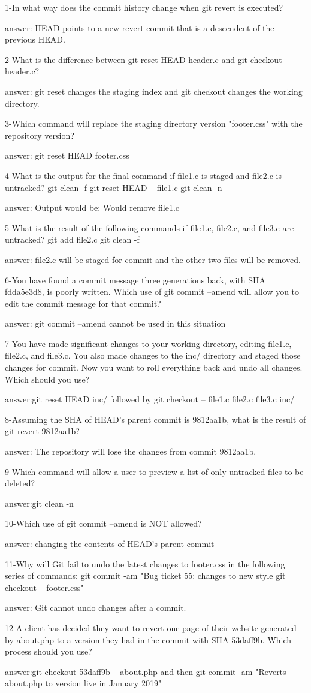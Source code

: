 1-In what way does the commit history change when git revert is executed?

answer: HEAD points to a new revert commit that is a descendent of the previous HEAD.

2-What is the difference between git reset HEAD header.c and git checkout -- header.c?

answer: git reset changes the staging index and git checkout changes the working directory.

3-Which command will replace the staging directory version "footer.css" with the repository version?

answer: git reset HEAD footer.css

4-What is the output for the final command if file1.c is staged and file2.c is untracked? git clean -f git reset HEAD -- file1.c git clean -n

answer: Output would be: Would remove file1.c

5-What is the result of the following commands if file1.c, file2.c, and file3.c are untracked? git add file2.c git clean -f

answer: file2.c will be staged for commit and the other two files will be removed.

6-You have found a commit message three generations back, with SHA fdda5e3d8, is poorly written. Which use of git commit --amend will allow you to edit the commit message for that commit?

answer: git commit --amend cannot be used in this situation

7-You have made significant changes to your working directory, editing file1.c, file2.c, and file3.c. You also made changes to the inc/ directory and staged those changes for commit. Now you want to roll everything back and undo all changes. Which should you use?

answer:git reset HEAD inc/ followed by git checkout -- file1.c file2.c file3.c inc/
 
8-Assuming the SHA of HEAD's parent commit is 9812aa1b, what is the result of git revert 9812aa1b?

answer: The repository will lose the changes from commit 9812aa1b.

9-Which command will allow a user to preview a list of only untracked files to be deleted?

answer:git clean -n
 
10-Which use of git commit --amend is NOT allowed?

answer: changing the contents of HEAD's parent commit

11-Why will Git fail to undo the latest changes to footer.css in the following series of commands: git commit -am "Bug ticket 55: changes to new style git checkout -- footer.css"

answer: Git cannot undo changes after a commit.

12-A client has decided they want to revert one page of their website generated by about.php to a version they had in the commit with SHA 53daff9b. Which process should you use?

answer:git checkout 53daff9b -- about.php and then git commit -am "Reverts about.php to version live in January 2019"